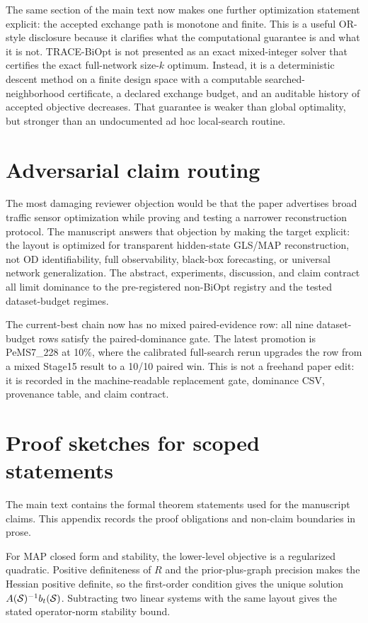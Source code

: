 The same section of the main text now makes one further optimization statement
explicit: the accepted exchange path is monotone and finite. This is a useful
OR-style disclosure because it clarifies what the computational guarantee is
and what it is not. TRACE-BiOpt is not presented as an exact mixed-integer
solver that certifies the exact full-network size-$k$ optimum. Instead, it is a
deterministic descent method on a finite design space with a computable
searched-neighborhood certificate, a declared exchange budget, and an auditable
history of accepted objective decreases. That guarantee is weaker than global
optimality, but stronger than an undocumented ad hoc local-search routine.

\FloatBarrier
\section{Adversarial claim routing}

The most damaging reviewer objection would be that the paper advertises broad
traffic sensor optimization while proving and testing a narrower reconstruction
protocol. The manuscript answers that objection by making the target explicit:
the layout is optimized for transparent hidden-state GLS/MAP reconstruction,
not OD identifiability, full observability, black-box forecasting, or universal
network generalization. The abstract, experiments, discussion, and claim
contract all limit dominance to the pre-registered non-BiOpt registry and the
tested dataset-budget regimes.

The current-best chain now has no mixed paired-evidence row: all nine
dataset-budget rows satisfy the paired-dominance gate. The latest promotion is
PeMS7\_228 at 10\%, where the calibrated full-search rerun upgrades the row
from a mixed Stage15 result to a 10/10 paired win. This is not a freehand
paper edit: it is recorded in the machine-readable replacement gate, dominance
CSV, provenance table, and claim contract.

\FloatBarrier
\section{Proof sketches for scoped statements}

The main text contains the formal theorem statements used for the manuscript
claims. This appendix records the proof obligations and non-claim boundaries in
prose.

For MAP closed form and stability, the lower-level objective is a regularized
quadratic. Positive definiteness of $R$ and the prior-plus-graph precision makes
the Hessian positive definite, so the first-order condition gives the unique
solution $A(\mathcal{S})^{-1}b_t(\mathcal{S})$. Subtracting two linear systems with the same
layout gives the stated operator-norm stability bound.

